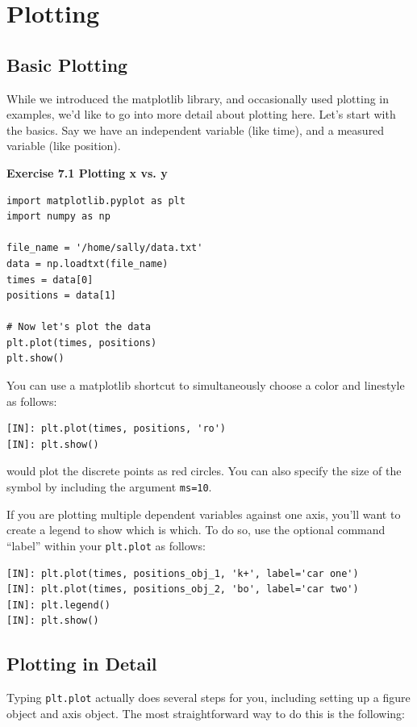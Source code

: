 \chapter{Plotting} %

\section{Basic Plotting} %
While we introduced the matplotlib library, and occasionally used plotting in examples, we'd like to go into more detail about plotting here. %
Let's start with the basics. Say we have an independent variable (like time), and a measured variable (like position). %

\textbf{Exercise 7.1 Plotting x vs. y} %
\begin{lstlisting}
import matplotlib.pyplot as plt
import numpy as np

file_name = '/home/sally/data.txt'
data = np.loadtxt(file_name)
times = data[0]
positions = data[1]

# Now let's plot the data
plt.plot(times, positions)
plt.show()
\end{lstlisting} %

You can use a matplotlib shortcut to simultaneously choose a color and linestyle as follows: %

\begin{lstlisting}
[IN]: plt.plot(times, positions, 'ro')
[IN]: plt.show()
\end{lstlisting} %

would plot the discrete points as red circles. %
You can also specify the size of the symbol by including the argument \texttt{ms=10}. %

If you are plotting multiple dependent variables against one axis, you'll want to create a legend to show which is which. %
To do so, use the optional command ``label'' within your \texttt{plt.plot} as follows: %

\begin{lstlisting}
[IN]: plt.plot(times, positions_obj_1, 'k+', label='car one')
[IN]: plt.plot(times, positions_obj_2, 'bo', label='car two')
[IN]: plt.legend()
[IN]: plt.show()
\end{lstlisting} %

\section{Plotting in Detail} %
Typing \texttt{plt.plot} actually does several steps for you, including setting up a figure object and axis object. %
The most straightforward way to do this is the following: %

